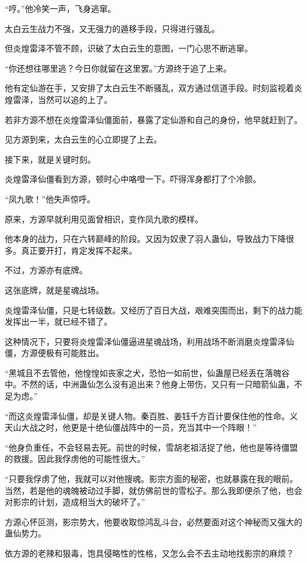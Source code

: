 \begin{this_body}
“哼。”他冷笑一声，飞身逃窜。

太白云生战力不强，又无强力的遁移手段，只得进行骚乱。

但炎煌雷泽不管不顾，识破了太白云生的意图，一门心思不断逃窜。

“你还想往哪里逃？今日你就留在这里罢。”方源终于追了上来。

他有定仙游在手，又安排了太白云生不断骚乱，双方通过信道手段。时刻监视着炎煌雷泽，当然可以追的上了。

若非方源不想在炎煌雷泽仙僵面前，暴露了定仙游和自己的身份，他早就赶到了。

见方源到来，太白云生的心立即提了上去。

接下来，就是关键时刻。

炎煌雷泽仙僵看到方源，顿时心中咯噔一下。吓得浑身都打了个冷颤。

“凤九歌！”他失声惊呼。

原来，方源早就利用见面曾相识，变作凤九歌的模样。

他本身的战力，只在六转巅峰的阶段。又因为奴隶了羽人蛊仙，导致战力下降很多。真正要开打，肯定发挥不起来。

不过，方源亦有底牌。

这张底牌，就是星魂战场。

炎煌雷泽仙僵，只是七转级数。又经历了百日大战，艰难突围而出，剩下的战力能发挥出一半，就已经不错了。

这种情况下，只要将炎煌雷泽仙僵逼进星魂战场，利用战场不断消磨炎煌雷泽仙僵，方源便极有可能胜出。

“黑城且不去管他，他惶惶如丧家之犬，恐怕一如前世，仙蛊屋已经丢在落魄谷中。不然的话，中洲蛊仙怎么没有追出来？他身上带伤，又只有一只暗箭仙蛊，不足为虑。”

“而这炎煌雷泽仙僵，却是关键人物。秦百胜、姜钰千方百计要保住他的性命。义天山大战之时，他更是十绝仙僵战阵中的一员，充当其中一个阵眼！”

“他身负重任，不会轻易去死。前世的时候，雪胡老祖活捉了他，他也是等待僵盟的救援。因此我俘虏他的可能性很大。”

“只要我俘虏了他，我就可以对他搜魂。影宗方面的秘密，也就暴露在我的眼前。当然，若是他的魂魄被动过手脚，就仿佛前世的雪松子。那么我即便杀了他，也会对影宗的计划，造成相当大的破坏了。”

方源心怀叵测，影宗势大，他要收取惊鸿乱斗台，必然要面对这个神秘而又强大的蛊仙势力。

依方源的老辣和狠毒，饱具侵略性的性格，又怎么会不去主动地找影宗的麻烦？


\end{this_body}
